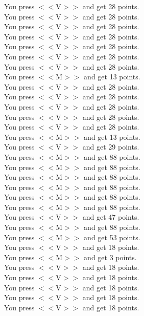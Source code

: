 \documentclass[pdflatex,sn-nature]{sn-jnl}%
\theoremstyle{thmstyleone}%
\theoremstyle{thmstyletwo}%
\theoremstyle{thmstylethree}%
\begin{document}
You press $<<$V$>>$ and get 28 points. $~$\\ 
You press $<<$V$>>$ and get 28 points. $~$\\ 
You press $<<$V$>>$ and get 28 points. $~$\\ 
You press $<<$V$>>$ and get 28 points. $~$\\ 
You press $<<$V$>>$ and get 28 points. $~$\\ 
You press $<<$V$>>$ and get 28 points. $~$\\ 
You press $<<$V$>>$ and get 28 points. $~$\\ 
You press $<<$M$>>$ and get 13 points. $~$\\ 
You press $<<$V$>>$ and get 28 points. $~$\\ 
You press $<<$V$>>$ and get 28 points. $~$\\ 
You press $<<$V$>>$ and get 28 points. $~$\\ 
You press $<<$V$>>$ and get 28 points. $~$\\ 
You press $<<$V$>>$ and get 28 points. $~$\\ 
You press $<<$M$>>$ and get 13 points. $~$\\ 
You press $<<$V$>>$ and get 29 points. $~$\\ 
You press $<<$M$>>$ and get 88 points. $~$\\ 
You press $<<$M$>>$ and get 88 points. $~$\\ 
You press $<<$M$>>$ and get 88 points. $~$\\ 
You press $<<$M$>>$ and get 88 points. $~$\\ 
You press $<<$M$>>$ and get 88 points. $~$\\ 
You press $<<$M$>>$ and get 88 points. $~$\\ 
You press $<<$V$>>$ and get 47 points. $~$\\ 
You press $<<$M$>>$ and get 88 points. $~$\\ 
You press $<<$M$>>$ and get 53 points. $~$\\ 
You press $<<$V$>>$ and get 18 points. $~$\\ 
You press $<<$M$>>$ and get 3 points. $~$\\ 
You press $<<$V$>>$ and get 18 points. $~$\\ 
You press $<<$V$>>$ and get 18 points. $~$\\ 
You press $<<$V$>>$ and get 18 points. $~$\\ 
You press $<<$V$>>$ and get 18 points. $~$\\ 
You press $<<$V$>>$ and get 18 points. $~$\\ 
\end{document}
